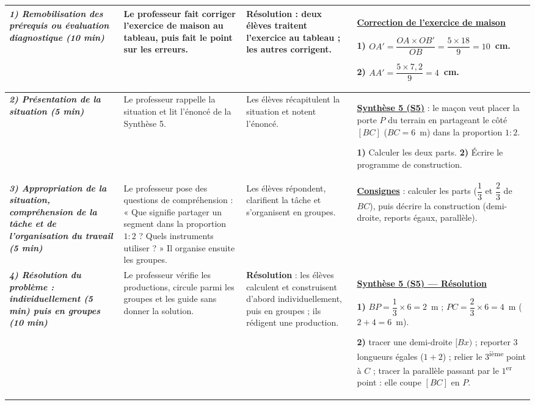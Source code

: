 \documentclass[10pt]{article}
\newcommand{\titreR}[1]{\underline{\textcolor{rougetitre}{\bfseries #1}}}
\newcommand{\seance}[1]{\fcolorbox{bleuseance}{bleufond}{\textcolor{bleuseance}{\bfseries #1}}}
\newcommand{\moment}[1]{\textbf{\itshape #1}}
\newcommand{\ieme}{\textsuperscript{ième}}
\newcommand{\ier}{\textsuperscript{er}}
\begin{document}
\begin{longtable}{|p{2.35cm}|p{5.35cm}|p{4.55cm}|p{13.85cm}|}
\hline
\seance{SEANCE 5} \newline \moment{1) Remobilisation des prérequis ou évaluation diagnostique (10 min)} &
Le professeur fait corriger l'exercice de maison au tableau, puis fait le point sur les erreurs. &
\textbf{Résolution} : deux élèves traitent l'exercice au tableau ; les autres corrigent. &
\titreR{Correction de l'exercice de maison} \par
\textbf{1)} $OA'=\dfrac{OA\times OB'}{OB}=\dfrac{5\times18}{9}=10$~cm. \par
\textbf{2)} $AA'=\dfrac{5\times7{,}2}{9}=4$~cm. \\ \hline

\moment{2) Présentation de la situation (5 min)} &
Le professeur rappelle la situation  et lit l'énoncé de la Synthèse 5. &
Les élèves récapitulent la situation et notent l'énoncé. &
\titreR{Synthèse 5 (S5)} : le maçon veut placer la porte $P$ du terrain en
partageant le côté $[BC]$ ($BC=6$~m) dans la proportion $1:2$. \par
\textbf{1)} Calculer les deux parts. \textbf{2)} Écrire le programme de
construction. \\ \hline

\moment{3) Appropriation de la situation, compréhension de la tâche et de
l'organisation du travail (5 min)} &
Le professeur pose des questions de compréhension : « Que signifie partager un segment dans la proportion $1:2$ ? Quels instruments utiliser ? » Il organise ensuite les groupes. &
Les élèves répondent, clarifient la tâche et s'organisent en groupes. &
\titreR{Consignes} : calculer les parts ($\dfrac{1}{3}$ et $\dfrac{2}{3}$ de $BC$),
puis décrire la construction (demi-droite, reports égaux, parallèle). \\ \hline

\moment{4) Résolution du problème : individuellement (5 min) puis en groupes (10 min)} &
Le professeur vérifie les productions, circule parmi les groupes et les guide sans donner la solution. &
\textbf{Résolution} : les élèves calculent et construisent d'abord individuellement, puis en groupes ; ils rédigent une production. &
\titreR{Synthèse 5 (S5) — Résolution} \par
\textbf{1)} $BP=\dfrac{1}{3}\times6=2$~m ; $PC=\dfrac{2}{3}\times6=4$~m
($2+4=6$~m). \par
\textbf{2)} tracer une demi-droite $[Bx)$ ; reporter $3$ longueurs égales ($1+2$) ;
relier le $3$\ieme{} point à $C$ ; tracer la parallèle passant par le $1$\ier{}
point : elle coupe $[BC]$ en $P$. \\ \hline


\end{longtable}
\end{document}
